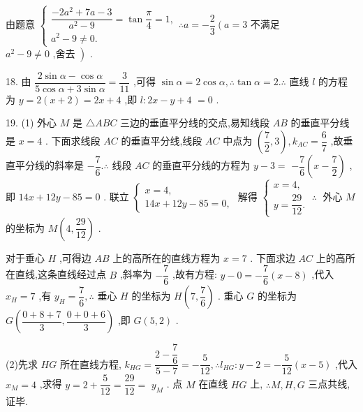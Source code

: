 由题意 $\left\{  {\begin{array}{l} \dfrac{-2{a}^{2} + {7a} - 3}{{a}^{2} - 9} = \tan \dfrac{\pi }{4} = 1, \\  {a}^{2} - 9 \neq  0. \end{array}\therefore a =  - \dfrac{2}{3}\left( {a = 3}\right. }\right.$ 不满足 $\left. {{a}^{2} - 9 \neq  0\text{ ,舍去 }}\right)$ .

18. 由 $\dfrac{2\sin \alpha  - \cos \alpha }{5\cos \alpha  + 3\sin \alpha } = \dfrac{3}{11}$ ,可得 $\sin \alpha  = 2\cos \alpha ,\therefore \tan \alpha  = 2.\therefore$ 直线 $l$ 的方程为 $y = 2\left( {x + 2}\right)  = {2x} + 4$ ,即 $l : {2x} - y + 4$  $= 0$ .

19. (1) 外心 $M$ 是 $\bigtriangleup {ABC}$ 三边的垂直平分线的交点,易知线段 ${AB}$ 的垂直平分线是 $x = 4$ . 下面求线段 ${AC}$ 的垂直平分线,线段 ${AC}$ 中点为 $\left( {\dfrac{7}{2},3}\right) ,{k}_{AC} = \dfrac{6}{7}$ ,故垂直平分线的斜率是 $- \dfrac{7}{6}.\therefore$ 线段 ${AC}$ 的垂直平分线的方程为 $y - 3 =$  $- \dfrac{7}{6}\left( {x - \dfrac{7}{2}}\right)$ ,即 ${14x} + {12y} - {85} = 0$ . 联立 $\left\{  \begin{array}{l} x = 4, \\  {14x} + {12y} - {85} = 0, \end{array}\right.$ 解得 $\left\{  {\begin{array}{l} x = 4, \\  y = \dfrac{29}{12}. \end{array}\;\therefore \;\text{ 外心 }M}\right.$ 的坐标为 $M\left( {4,\dfrac{29}{12}}\right)$ .

对于垂心 $H$ ,可得边 ${AB}$ 上的高所在的直线方程为 $x = 7$ . 下面求边 ${AC}$ 上的高所在直线,这条直线经过点 $B$ ,斜率为 $- \dfrac{7}{6}$ ,故有方程: $y - 0 =  - \dfrac{7}{6}\left( {x - 8}\right)$ ,代入 ${x}_{H} = 7$ ,有 ${y}_{H} = \dfrac{7}{6},\therefore$ 垂心 $H$ 的坐标为 $H\left( {7,\dfrac{7}{6}}\right)$ . 重心 $G$ 的坐标为 $G\left( {\dfrac{0 + 8 + 7}{3},\dfrac{0 + 0 + 6}{3}}\right)$ ,即 $G\left( {5,2}\right)$ .

(2)先求 ${HG}$ 所在直线方程, ${k}_{HG} = \dfrac{2 - \dfrac{7}{6}}{5 - 7} =  - \dfrac{5}{12},\therefore {l}_{HG} : y - 2 =  - \dfrac{5}{12}\left( {x - 5}\right)$ ,代入 ${x}_{M} = 4$ ,求得 $y = 2 + \dfrac{5}{12} = \dfrac{29}{12} =$  ${y}_{M}$ . 点 $M$ 在直线 ${HG}$ 上, $\therefore M,H,G$ 三点共线,证毕.

